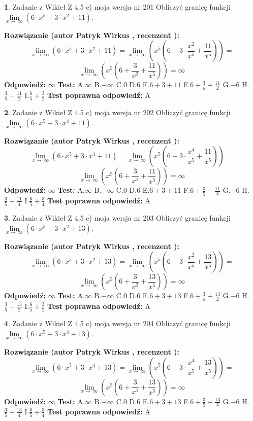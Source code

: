 \documentclass[12pt, a4paper]{article}
\theoremstyle{definition} %
\newtheorem{zad}{}
\newcommand{\zadStart}[1]{\begin{zad}#1\newline}
\newcommand{\zadStop}{\end{zad}}
\newcommand{\rozwStart}[2]{\noindent \textbf{Rozwiązanie (autor #1 , recenzent #2): }\newline}
\newcommand{\rozwStop}{\newline}
\newcommand{\odpStart}{\noindent \textbf{Odpowiedź:}\newline}
\newcommand{\odpStop}{\newline}
\newcommand{\testStart}{\noindent \textbf{Test:}\newline}
\newcommand{\testStop}{\newline}
\newcommand{\kluczStart}{\noindent \textbf{Test poprawna odpowiedź:}\newline}
\newcommand{\kluczStop}{\newline}
\begin{document}
\zadStart{Zadanie z Wikieł Z 4.5 c) moja wersja nr 201}
Obliczyć granicę funkcji  $\lim\limits_{x\to\ \infty}(6 \cdot x^{5}+3 \cdot x^{2}+11)$.
\zadStop
\rozwStart{Patryk Wirkus}{}
$$\lim\limits_{x\to\ \infty}(6 \cdot x^{5}+3 \cdot x^{2}+11) = \lim\limits_{x\to\ \infty}(x^{5}(6 +3 \cdot \frac{x^{2}}{x^{5}}+\frac{11}{x^{5}})) =$$ $$\lim\limits_{x\to\ \infty}(x^{5}(6 +\frac{3}{x^{3}}+\frac{11}{x^{5}})) =\infty$$
\rozwStop
\odpStart
$\infty$
\odpStop
\testStart
A.$\infty$ B.$-\infty$ C.$0$ D.$6$ E.$6 + 3 + 11$
F.$6+\frac{3}{5}+\frac{11}{2}$ G.$-6$
H.$\frac{3}{5}+\frac{11}{2}$
I.$\frac{6}{5}+\frac{3}{2}$
\testStop
\kluczStart
A
\kluczStop



\zadStart{Zadanie z Wikieł Z 4.5 c) moja wersja nr 202}
Obliczyć granicę funkcji  $\lim\limits_{x\to\ \infty}(6 \cdot x^{5}+3 \cdot x^{4}+11)$.
\zadStop
\rozwStart{Patryk Wirkus}{}
$$\lim\limits_{x\to\ \infty}(6 \cdot x^{5}+3 \cdot x^{4}+11) = \lim\limits_{x\to\ \infty}(x^{5}(6 +3 \cdot \frac{x^{4}}{x^{5}}+\frac{11}{x^{5}})) =$$ $$\lim\limits_{x\to\ \infty}(x^{5}(6 +\frac{3}{x^{1}}+\frac{11}{x^{5}})) =\infty$$
\rozwStop
\odpStart
$\infty$
\odpStop
\testStart
A.$\infty$ B.$-\infty$ C.$0$ D.$6$ E.$6 + 3 + 11$
F.$6+\frac{3}{5}+\frac{11}{4}$ G.$-6$
H.$\frac{3}{5}+\frac{11}{4}$
I.$\frac{6}{5}+\frac{3}{4}$
\testStop
\kluczStart
A
\kluczStop



\zadStart{Zadanie z Wikieł Z 4.5 c) moja wersja nr 203}
Obliczyć granicę funkcji  $\lim\limits_{x\to\ \infty}(6 \cdot x^{5}+3 \cdot x^{2}+13)$.
\zadStop
\rozwStart{Patryk Wirkus}{}
$$\lim\limits_{x\to\ \infty}(6 \cdot x^{5}+3 \cdot x^{2}+13) = \lim\limits_{x\to\ \infty}(x^{5}(6 +3 \cdot \frac{x^{2}}{x^{5}}+\frac{13}{x^{5}})) =$$ $$\lim\limits_{x\to\ \infty}(x^{5}(6 +\frac{3}{x^{3}}+\frac{13}{x^{5}})) =\infty$$
\rozwStop
\odpStart
$\infty$
\odpStop
\testStart
A.$\infty$ B.$-\infty$ C.$0$ D.$6$ E.$6 + 3 + 13$
F.$6+\frac{3}{5}+\frac{13}{2}$ G.$-6$
H.$\frac{3}{5}+\frac{13}{2}$
I.$\frac{6}{5}+\frac{3}{2}$
\testStop
\kluczStart
A
\kluczStop



\zadStart{Zadanie z Wikieł Z 4.5 c) moja wersja nr 204}
Obliczyć granicę funkcji  $\lim\limits_{x\to\ \infty}(6 \cdot x^{5}+3 \cdot x^{4}+13)$.
\zadStop
\rozwStart{Patryk Wirkus}{}
$$\lim\limits_{x\to\ \infty}(6 \cdot x^{5}+3 \cdot x^{4}+13) = \lim\limits_{x\to\ \infty}(x^{5}(6 +3 \cdot \frac{x^{4}}{x^{5}}+\frac{13}{x^{5}})) =$$ $$\lim\limits_{x\to\ \infty}(x^{5}(6 +\frac{3}{x^{1}}+\frac{13}{x^{5}})) =\infty$$
\rozwStop
\odpStart
$\infty$
\odpStop
\testStart
A.$\infty$ B.$-\infty$ C.$0$ D.$6$ E.$6 + 3 + 13$
F.$6+\frac{3}{5}+\frac{13}{4}$ G.$-6$
H.$\frac{3}{5}+\frac{13}{4}$
I.$\frac{6}{5}+\frac{3}{4}$
\testStop
\kluczStart
A
\kluczStop
\end{document}
